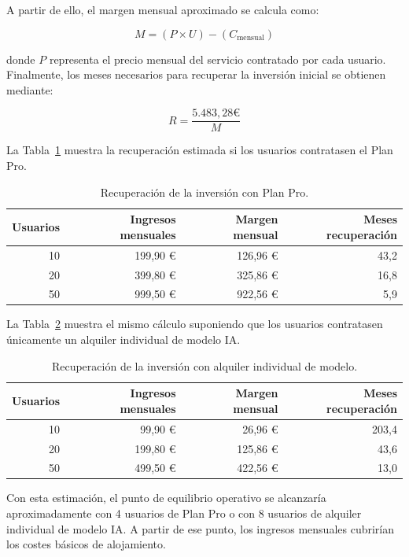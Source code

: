 A partir de ello, el margen mensual aproximado se calcula como:

\[
M = (P \times U) - (C_{\text{mensual}} )
\]

donde \(P\) representa el precio mensual del servicio contratado por cada usuario. Finalmente, los meses necesarios para recuperar la inversión inicial se obtienen mediante:

\[
R = \frac{5.483,28\text{€}}{M}
\]

La Tabla~\ref{tabla:recuperacion_plan_pro} muestra la recuperación estimada si los usuarios contratasen el Plan Pro.

\begin{table}[H]
	\centering
	\begin{tabular}{@{}rrrr@{}}
		\toprule
		\textbf{Usuarios} & \textbf{Ingresos mensuales} & \textbf{Margen mensual} & \textbf{Meses recuperación} \\
		\midrule
		10 & 199,90 € & 126,96 € & 43,2 \\
		20 & 399,80 € & 325,86 € & 16,8 \\
		50 & 999,50 € & 922,56 € & 5,9 \\
		\bottomrule
	\end{tabular}
	\caption{Recuperación de la inversión con Plan Pro.}
	\label{tabla:recuperacion_plan_pro}
\end{table}

La Tabla~\ref{tabla:recuperacion_alquiler} muestra el mismo cálculo suponiendo que los usuarios contratasen únicamente un alquiler individual de modelo IA.

\begin{table}[H]
	\centering
	\begin{tabular}{@{}rrrr@{}}
		\toprule
		\textbf{Usuarios} & \textbf{Ingresos mensuales} & \textbf{Margen mensual} & \textbf{Meses recuperación} \\
		\midrule
		10 & 99,90 € & 26,96 € & 203,4 \\
		20 & 199,80 € & 125,86 € & 43,6 \\
		50 & 499,50 € & 422,56 € & 13,0 \\
		\bottomrule
	\end{tabular}
	\caption{Recuperación de la inversión con alquiler individual de modelo.}
	\label{tabla:recuperacion_alquiler}
\end{table}

Con esta estimación, el punto de equilibrio operativo se alcanzaría aproximadamente con 4 usuarios de Plan Pro o con 8 usuarios de alquiler individual de modelo IA. A partir de ese punto, los ingresos mensuales cubrirían los costes básicos de alojamiento.

